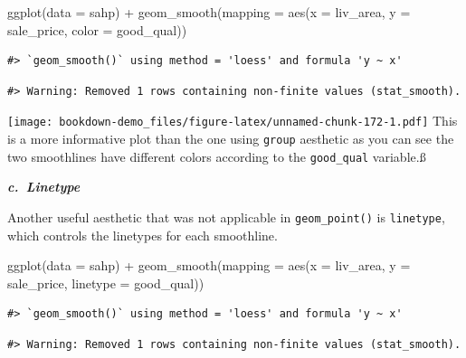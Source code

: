 \documentclass[
]{book}
\newenvironment{Shaded}{\begin{snugshade}}{\end{snugshade}}
\newcommand{\AttributeTok}[1]{\textcolor[rgb]{0.77,0.63,0.00}{#1}}
\newcommand{\FunctionTok}[1]{\textcolor[rgb]{0.00,0.00,0.00}{#1}}
\newcommand{\NormalTok}[1]{#1}
\newcommand{\SpecialCharTok}[1]{\textcolor[rgb]{0.00,0.00,0.00}{#1}}
\begin{document}
\begin{Shaded}
\begin{Highlighting}[]
\FunctionTok{ggplot}\NormalTok{(}\AttributeTok{data =}\NormalTok{ sahp) }\SpecialCharTok{+} \FunctionTok{geom\_smooth}\NormalTok{(}\AttributeTok{mapping =} \FunctionTok{aes}\NormalTok{(}\AttributeTok{x =}\NormalTok{ liv\_area, }\AttributeTok{y =}\NormalTok{ sale\_price, }\AttributeTok{color =}\NormalTok{ good\_qual))}
\end{Highlighting}
\end{Shaded}

\begin{verbatim}
#> `geom_smooth()` using method = 'loess' and formula 'y ~ x'
\end{verbatim}

\begin{verbatim}
#> Warning: Removed 1 rows containing non-finite values (stat_smooth).
\end{verbatim}

\texttt{[image: bookdown-demo\_files/figure-latex/unnamed-chunk-172-1.pdf]}
This is a more informative plot than the one using \texttt{group} aesthetic as you can see the two smoothlines have different colors according to the \texttt{good\_qual} variable.ß

\textbf{\emph{c.~Linetype}}

Another useful aesthetic that was not applicable in \texttt{geom\_point()} is \texttt{linetype}, which controls the linetypes for each smoothline.

\begin{Shaded}
\begin{Highlighting}[]
\FunctionTok{ggplot}\NormalTok{(}\AttributeTok{data =}\NormalTok{ sahp) }\SpecialCharTok{+} \FunctionTok{geom\_smooth}\NormalTok{(}\AttributeTok{mapping =} \FunctionTok{aes}\NormalTok{(}\AttributeTok{x =}\NormalTok{ liv\_area, }\AttributeTok{y =}\NormalTok{ sale\_price, }\AttributeTok{linetype =}\NormalTok{ good\_qual))}
\end{Highlighting}
\end{Shaded}

\begin{verbatim}
#> `geom_smooth()` using method = 'loess' and formula 'y ~ x'
\end{verbatim}

\begin{verbatim}
#> Warning: Removed 1 rows containing non-finite values (stat_smooth).
\end{verbatim}
\end{document}

